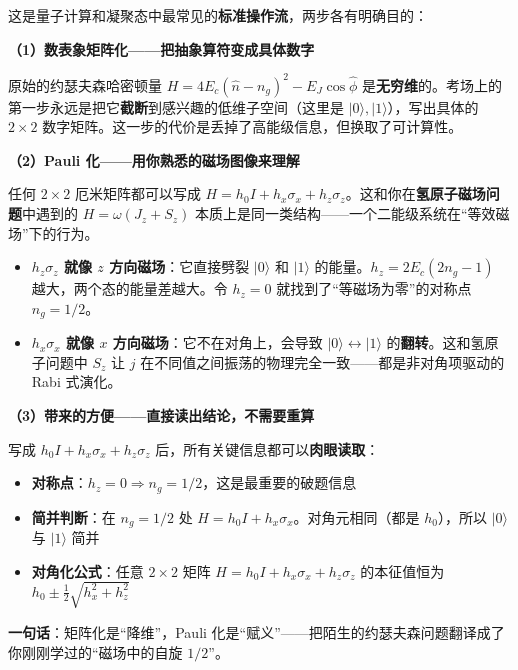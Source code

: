 \begin{insightbox}
这是量子计算和凝聚态中最常见的\textbf{标准操作流}，两步各有明确目的：

\textbf{（1）数表象矩阵化——把抽象算符变成具体数字}

原始的约瑟夫森哈密顿量 $H = 4E_c(\hat{n}-n_g)^2 - E_J\cos\hat{\phi}$ 是\textbf{无穷维}的。考场上的第一步永远是把它\textbf{截断}到感兴趣的低维子空间（这里是 $|0\rangle, |1\rangle$），写出具体的 $2\times 2$ 数字矩阵。这一步的代价是丢掉了高能级信息，但换取了可计算性。

\textbf{（2）Pauli 化——用你熟悉的磁场图像来理解}

任何 $2\times 2$ 厄米矩阵都可以写成 $H = h_0 I + h_x \sigma_x + h_z \sigma_z$。这和你在\textbf{氢原子磁场问题}中遇到的 $H = \omega(J_z + S_z)$ 本质上是同一类结构——一个二能级系统在``等效磁场''下的行为。

\begin{itemize}[nosep]
    \item \textbf{$h_z \sigma_z$ 就像 $z$ 方向磁场}：它直接劈裂 $|0\rangle$ 和 $|1\rangle$ 的能量。$h_z = 2E_c(2n_g-1)$ 越大，两个态的能量差越大。令 $h_z=0$ 就找到了``等磁场为零''的对称点 $n_g=1/2$。
    \item \textbf{$h_x \sigma_x$ 就像 $x$ 方向磁场}：它不在对角上，会导致 $|0\rangle \leftrightarrow |1\rangle$ 的\textbf{翻转}。这和氢原子问题中 $S_z$ 让 $j$ 在不同值之间振荡的物理完全一致——都是非对角项驱动的 Rabi 式演化。
\end{itemize}

\textbf{（3）带来的方便——直接读出结论，不需要重算}

写成 $h_0 I + h_x \sigma_x + h_z \sigma_z$ 后，所有关键信息都可以\textbf{肉眼读取}：
\begin{itemize}[nosep]
    \item \textbf{对称点}：$h_z = 0 \Rightarrow n_g = 1/2$，这是最重要的破题信息
    \item \textbf{简并判断}：在 $n_g=1/2$ 处 $H = h_0 I + h_x \sigma_x$。对角元相同（都是 $h_0$），所以 $|0\rangle$ 与 $|1\rangle$ 简并
    \item \textbf{对角化公式}：任意 $2\times 2$ 矩阵 $H = h_0 I + h_x \sigma_x + h_z \sigma_z$ 的本征值恒为 $h_0 \pm \frac{1}{2}\sqrt{h_x^2+h_z^2}$
\end{itemize}

\textbf{一句话}：矩阵化是``降维''，Pauli 化是``赋义''——把陌生的约瑟夫森问题翻译成了你刚刚学过的``磁场中的自旋 $1/2$''。
\end{insightbox}

